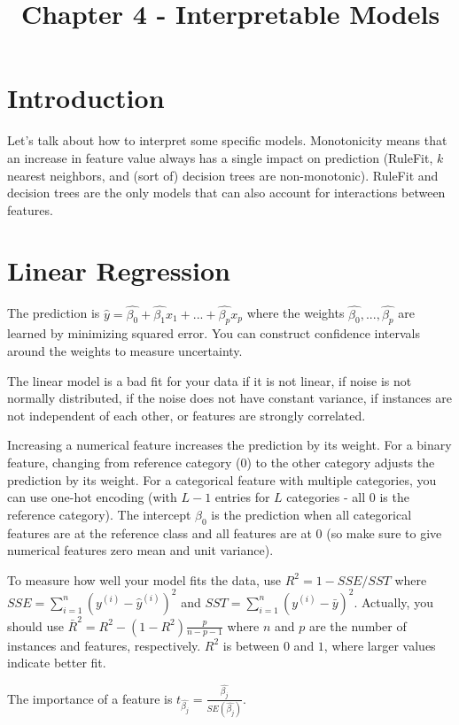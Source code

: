 \documentclass[a4paper]{article}
\title{Chapter 4 - Interpretable Models}
\date{}
\begin{document}
\maketitle

\section{Introduction}
Let's talk about how to interpret some specific models. Monotonicity means that
an increase in feature value always has a single impact on prediction (RuleFit,
$k$ nearest neighbors, and (sort of) decision trees are non-monotonic). RuleFit
and decision trees are the only models that can also account for interactions
between features.

\section{Linear Regression}
The prediction is $\hat{y} = \hat{\beta_0} + \hat{\beta_1} x_1 + ... +
\hat{\beta_p}
x_p$ where the weights $\hat{\beta_0}, ..., \hat{\beta_p}$ are learned by
minimizing squared error. You can construct confidence intervals around the
weights to measure uncertainty.

The linear model is a bad fit for your data if it is not linear, if noise is
not normally distributed, if the noise does not have constant variance, if
instances are not independent of each other, or features are strongly
correlated.

Increasing a numerical feature increases the prediction by its weight. For a
binary feature, changing from reference category (0) to the other category
adjusts the prediction by its weight. For a categorical feature with multiple
categories, you can use one-hot encoding (with $L - 1$ entries for $L$
categories - all $0$ is the reference category). The intercept $\beta_0$ is the
prediction when all categorical features are at the reference class and all
features are at 0 (so make sure to give numerical features zero mean and unit
variance).

To measure how well your model fits the data, use $R^2 = 1 - SSE / SST$ where $SSE
= \sum_{i=1}^{n}{(y^{(i)} - \hat{y}^{(i)})^2}$ and $SST = \sum_{i=1}^{n}{(y^{(i)} - \bar{y})^2}$. Actually, you should use $\bar{R}^2 = R^2 - (1 - R^2) \frac{p}{
n - p - 1}$ where $n$ and $p$ are the number of instances and features,
respectively. $R^2$ is between $0$ and $1$, where larger values indicate better
fit.

The importance of a feature is $t_{\hat{\beta_j}} = \frac{\hat{\beta_j}}{
SE(\hat{\beta_j})}$.
\end{document}
